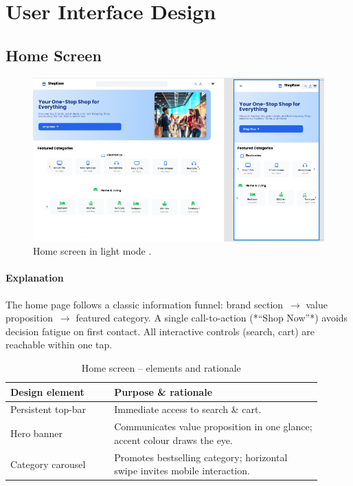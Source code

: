 \documentclass[11pt,a4paper]{article}
\begin{document}
\section{User Interface Design}\label{sec:user-interface-design}

\subsection{Home Screen}\label{subsec:home-screen}

	\begin{figure}[H]
	\centering
	\includegraphics[width=\linewidth]{pictures/main/Home_figma}%
	\caption{Home screen in light mode .}
	\label{fig:ui-home}
\end{figure}

\paragraph{Explanation}%
The home page follows a classic information funnel: brand section~$\rightarrow$ value
proposition~$\rightarrow$ featured category. A single call-to-action
(*“Shop Now”*) avoids decision fatigue on first contact.  
All interactive controls (search, cart) are reachable within one
tap.

\begin{table}[H]
	\centering
	\caption{Home screen – elements and rationale}
	\label{tab:home-elements}
	\begin{tabular}{p{0.30\linewidth} p{0.60\linewidth}}
		\toprule
		\textbf{Design element} & \textbf{Purpose \& rationale} \\ \midrule
		Persistent top-bar      & Immediate access to search \& cart.\\
		Hero banner             & Communicates value proposition in one glance; accent colour draws the eye.\\
		Category carousel       & Promotes bestselling category; horizontal swipe invites mobile interaction.\\
		
		\bottomrule
	\end{tabular}
\end{table}
\end{document}
